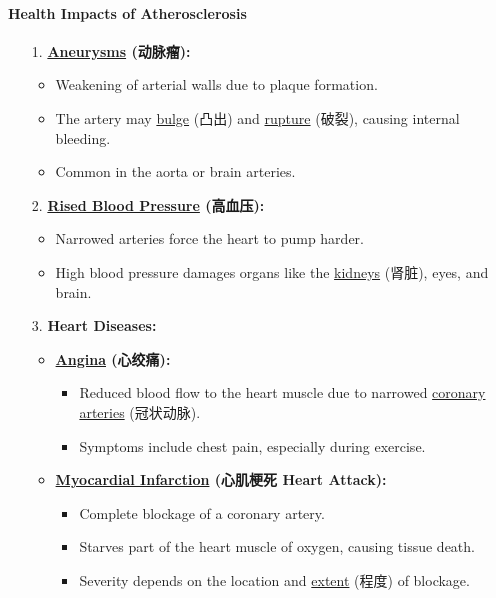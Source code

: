 \paragraph{Health Impacts of Atherosclerosis}
\begin{itemize}
    \item[1.] \textbf{\underline{Aneurysms} (动脉瘤):}
    \begin{itemize}
        \item Weakening of arterial walls due to plaque formation.
        \item The artery may \underline{bulge} (凸出) and \underline{rupture} (破裂), causing internal bleeding.
        \item Common in the aorta or brain arteries.
    \end{itemize}
    \item[2.] \textbf{\underline{Rised Blood Pressure} (高血压):}
    \begin{itemize}
        \item Narrowed arteries force the heart to pump harder.
        \item High blood pressure damages organs like the \underline{kidneys} (肾脏), eyes, and brain.
    \end{itemize}
    \item[3.] \textbf{Heart Diseases:}
    \begin{itemize}
        \item \textbf{\underline{Angina} (心绞痛):}
        \begin{itemize}
            \item Reduced blood flow to the heart muscle due to narrowed \underline{coronary arteries} (冠状动脉).
            \item Symptoms include chest pain, especially during exercise.
        \end{itemize}
        \item \textbf{\underline{Myocardial Infarction} (心肌梗死 Heart Attack):}
        \begin{itemize}
            \item Complete blockage of a coronary artery.
            \item Starves part of the heart muscle of oxygen, causing tissue death.
            \item Severity depends on the location and \underline{extent} (程度) of blockage.
        \end{itemize}
        \begin{figure}[H]
            \centering

\end{figure}
\end{itemize}
\end{itemize}
